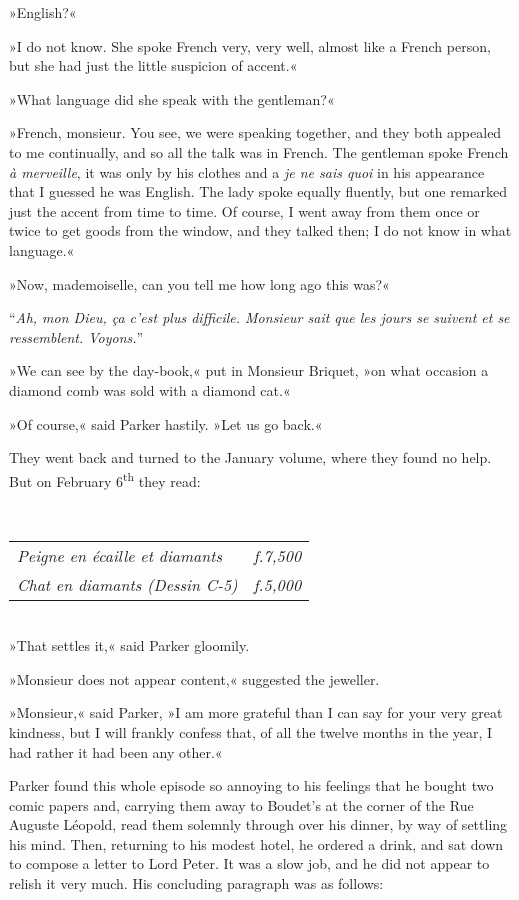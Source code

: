 »English?«

»I do not know. She spoke French very, very well, almost like a French person, but she had just the little suspicion of accent.«

»What language did she speak with the gentleman?«

»French, monsieur. You see, we were speaking together, and they both appealed to me continually, and so all the talk was in French. The gentleman spoke French \foreignlanguage{french}{\textit{à merveille}}, it was only by his clothes and a \foreignlanguage{french}{\textit{je ne sais quoi}} in his appearance that I guessed he was English. The lady spoke equally fluently, but one remarked just the accent from time to time. Of course, I went away from them once or twice to get goods from the window, and they talked then; I do not know in what language.«

»Now, mademoiselle, can you tell me how long ago this was?«

\foreignquote{french}{\textit{Ah, mon Dieu, ça c'est plus difficile. Monsieur sait que les jours se suivent et se ressemblent. Voyons.}}

»We can see by the day-book,« put in Monsieur Briquet, »on what occasion a diamond comb was sold with a diamond cat.«

»Of course,« said Parker hastily. »Let us go back.«

They went back and turned to the January volume, where they found no help. But on February 6\textsuperscript{th} they read:

~\\
\begin{tabular} { l l } 
\foreignlanguage{french}{\textit{Peigne en écaille et diamants}}&\textit{f.7,500}\\
\foreignlanguage{french}{\textit{Chat en diamants (Dessin C-5)}}&\textit{f.5,000}\\
\end{tabular}
~\\

»That settles it,« said Parker gloomily.

»Monsieur does not appear content,« suggested the jeweller.

»Monsieur,« said Parker, »I am more grateful than I can say for your very great kindness, but I will frankly confess that, of all the twelve months in the year, I had rather it had been any other.«

Parker found this whole episode so annoying to his feelings that he bought two comic papers and, carrying them away to Boudet's at the corner of the Rue Auguste Léopold, read them solemnly through over his dinner, by way of settling his mind. Then, returning to his modest hotel, he ordered a drink, and sat down to compose a letter to Lord Peter. It was a slow job, and he did not appear to relish it very much.  His concluding paragraph was as follows:

